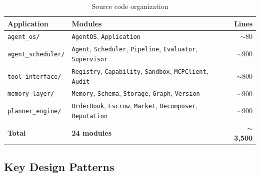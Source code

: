 \documentclass[12pt,a4paper]{article}
\theoremstyle{definition}
\begin{document}
\begin{table}[H]
\centering
\caption{Source code organization}
\begin{tabular}{llr}
\toprule
\textbf{Application} & \textbf{Modules} & \textbf{Lines} \\
\midrule
\texttt{agent\_os/}        & \texttt{AgentOS}, \texttt{Application}  & $\sim$80 \\
\texttt{agent\_scheduler/} & \texttt{Agent}, \texttt{Scheduler}, \texttt{Pipeline},
                              \texttt{Evaluator}, \texttt{Supervisor}  & $\sim$900 \\
\texttt{tool\_interface/}  & \texttt{Registry}, \texttt{Capability}, \texttt{Sandbox},
                              \texttt{MCPClient}, \texttt{Audit}  & $\sim$800 \\
\texttt{memory\_layer/}    & \texttt{Memory}, \texttt{Schema}, \texttt{Storage},
                              \texttt{Graph}, \texttt{Version}  & $\sim$900 \\
\texttt{planner\_engine/}  & \texttt{OrderBook}, \texttt{Escrow}, \texttt{Market},
                              \texttt{Decomposer}, \texttt{Reputation}  & $\sim$900 \\
\midrule
\textbf{Total}             & \textbf{24 modules} & $\sim$\textbf{3,500} \\
\bottomrule
\end{tabular}
\end{table}

\subsection{Key Design Patterns}
\end{document}
